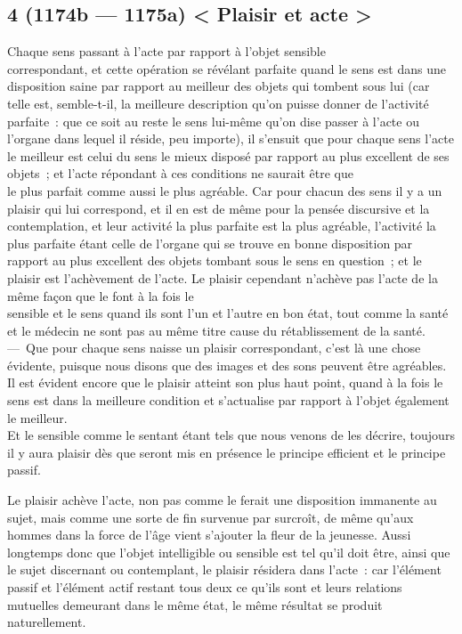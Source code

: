 \documentclass[french,twoside]{book} %
\begin{document}
\subsection[{4 (1174b — 1175a) < Plaisir et acte >}]{4 (1174b — 1175a) < Plaisir et acte >}
\noindent Chaque sens passant à l’acte par rapport à l’objet sensible \\
correspondant, et cette opération se révélant parfaite quand le sens est dans une disposition saine par rapport au meilleur des objets qui tombent sous lui (car telle est, semble-t-il, la meilleure description qu’on puisse donner de l’activité parfaite : que ce soit au reste le sens lui-même qu’on dise passer à l’acte ou l’organe dans lequel il réside, peu importe), il s’ensuit que pour chaque sens l’acte le meilleur est celui du sens le mieux disposé par rapport au plus excellent de ses objets ; et l’acte répondant à ces conditions ne saurait être que \\
le plus parfait comme aussi le plus agréable. Car pour chacun des sens il y a un plaisir qui lui correspond, et il en est de même pour la pensée discursive et la contemplation, et leur activité la plus parfaite est la plus agréable, l’activité la plus parfaite étant celle de l’organe qui se trouve en bonne disposition par rapport au plus excellent des objets tombant sous le sens en question ; et le plaisir est l’achèvement de l’acte. Le plaisir cependant n’achève pas l’acte de la même façon que le font à la fois le \\
sensible et le sens quand ils sont l’un et l’autre en bon état, tout comme la santé et le médecin ne sont pas au même titre cause du rétablissement de la santé. — Que pour chaque sens naisse un plaisir correspondant, c’est là une chose évidente, puisque nous disons que des images et des sons peuvent être agréables. Il est évident encore que le plaisir atteint son plus haut point, quand à la fois le sens est dans la meilleure condition et s’actualise par rapport à l’objet également le meilleur. \\
Et le sensible comme le sentant étant tels que nous venons de les décrire, toujours il y aura plaisir dès que seront mis en présence le principe efficient et le principe passif.\par
Le plaisir achève l’acte, non pas comme le ferait une disposition immanente au sujet, mais comme une sorte de fin survenue par surcroît, de même qu’aux hommes dans la force de l’âge vient s’ajouter la fleur de la jeunesse. Aussi longtemps donc que l’objet intelligible ou sensible est tel qu’il doit être,  ainsi que le sujet discernant ou contemplant, le plaisir résidera dans l’acte : car l’élément passif et l’élément actif restant tous deux ce qu’ils sont et leurs relations mutuelles demeurant dans le même état, le même résultat se produit naturellement.\par
\end{document}
